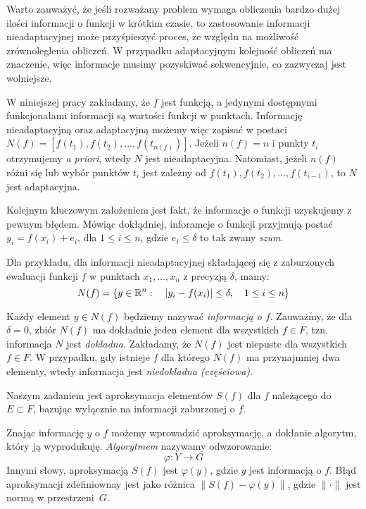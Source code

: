 \documentclass[oik, pdftex, robocza, man]{mgrwms}
\begin{document}
    Warto zauważyć, że jeśli rozważany problem wymaga obliczenia bardzo dużej ilości informacji o funkcji w krótkim czasie, to zastosowanie informacji nieadaptacyjnej może przyśpieszyć proces, ze względu na możliwość zrównoleglenia obliczeń. W przypadku adaptacyjnym kolejność obliczeń ma znaczenie, więc informacje musimy pozyskiwać sekwencyjnie, co zazwyczaj jest wolniejsze.

    W niniejszej pracy zakładamy, że $f$ jest funkcją, a jedynymi dostępnymi funkcjonałami informacji są wartości funkcji w punktach. Informację nieadaptacyjną oraz adaptacyjną możemy więc zapisać w postaci $N(f) = \left[ f(t_{1}), f(t_{2}), \ldots, f(t_{n(f)}) \right]$. Jeżeli $n(f) = n$ i punkty $t_{i}$ otrzymujemy \textit{a priori}, wtedy $N$ jest nieadaptacyjna. Natomiast, jeżeli $n(f)$ różni się lub wybór punktów $t_{i}$ jest zależny od $f(t_{1}), f(t_{2}), \ldots, f(t_{i-1})$, to $N$ jest adaptacyjna.

    Kolejnym kluczowym założeniem jest fakt, że informacje o funkcji uzyskujemy z pewnym błędem. Mówiąc dokłądniej, inforamcje o funkcji przyjmują postać $y_{i} = f(x_{i}) + e_{i}$, dla $1 \leq i \leq n$, gdzie $e_{i} \leq \delta$ to tak zwany \textit{szum}.
    
    Dla przykładu, dla informacji nieadaptacyjnej składającej się z zaburzonych ewaluacji funkcji $f$ w punktach $x_{1}, \dots, x_{n}$ z precyzją $\delta$, mamy:
    \begin{equation*}
        N(f) = \{y \in \mathbb{R}^{n} : \quad |y_{i} - f(x_{i})| \leq \delta, \quad 1 \leq i \leq n\}
    \end{equation*}
    
    Każdy element $y \in N(f)$ będziemy nazywać \textit{informacją o $f$}. Zauważmy, że dla $\delta = 0$, zbiór $N(f)$ ma dokładnie jeden element dla wszystkich $f \in F$, tzn. informacja $N$ jest \textit{dokładna}. Zakładamy, że $N(f)$ jest niepuste dla wszystkich $f \in F$. W przypadku, gdy istnieje $f$ dla którego $N(f)$ ma przynajmniej dwa elementy, wtedy informacja jest \textit{niedokładna (częściowa)}.

    Naszym zadaniem jest aproksymacja elementów $S(f)$ dla $f$ należącego do $E \subset F$, bazując wyłącznie na informacji zaburzonej o $f$. 

    Znając informację $y$ o $f$ możemy wprowadzić aproksymację, a dokłanie algorytm, który ją wyprodukuję. \textit{Algorytmem} nazywamy odwzorowanie:
    \begin{equation*}
        \varphi : Y \rightarrow G
    \end{equation*}
    Innymi słowy, aproksymacją $S(f)$ jest $\varphi(y)$, gdzie $y$ jest informacją o $f$. Błąd aproksymacji zdefiniownay jest jako różnica $\| S(f) - \varphi(y) \|$, gdzie $\|\cdot\|$ jest normą w przestrzeni~$G$.
\end{document}
